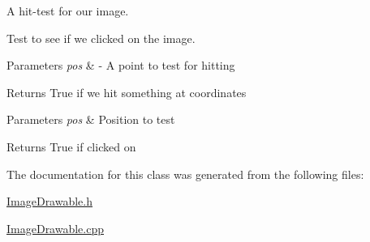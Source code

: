 A hit-\/test for our image. 

Test to see if we clicked on the image.


\begin{DoxyParams}{Parameters}
{\em pos} & -\/ A point to test for hitting \\
\hline
\end{DoxyParams}
\begin{DoxyReturn}{Returns}
True if we hit something at coordinates
\end{DoxyReturn}

\begin{DoxyParams}{Parameters}
{\em pos} & Position to test \\
\hline
\end{DoxyParams}
\begin{DoxyReturn}{Returns}
True if clicked on 
\end{DoxyReturn}


The documentation for this class was generated from the following files\+:\begin{DoxyCompactItemize}
\item 
\hyperlink{_image_drawable_8h}{Image\+Drawable.\+h}\item 
\hyperlink{_image_drawable_8cpp}{Image\+Drawable.\+cpp}\end{DoxyCompactItemize}
